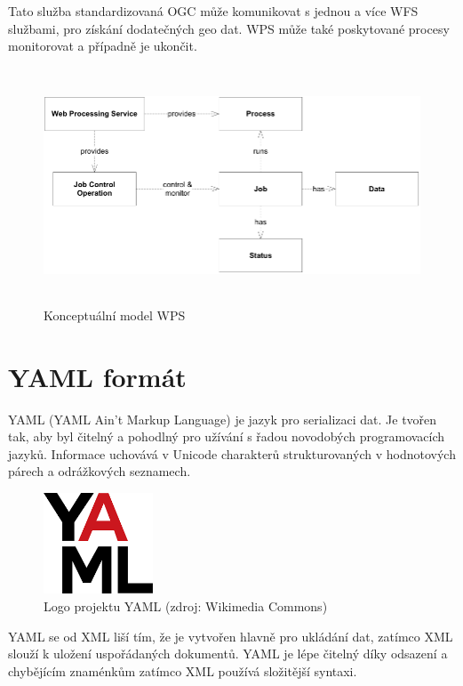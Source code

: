 \documentclass[a4paper,oneside,12pt]{book}
\begin{document}
\hspace{10mm}Tato služba standardizovaná OGC může komunikovat s jednou a více WFS službami, pro získání dodatečných geo dat. \cite{Stollberg2007} WPS může také poskytované procesy monitorovat a případně je ukončit. \cite{5Xjhvf3W3tsG6nhX} 

\begin{figure}[ht] \label{obr6}
\centering
\includegraphics[height=7cm]{pictures/WPS.png}
\caption{Konceptuální model WPS \cite{5Xjhvf3W3tsG6nhX}}
\label{fig:wps}
\end{figure}


\section{YAML formát} \label{yaml}



\hspace{10mm}YAML (YAML Ain’t Markup Language) je jazyk pro serializaci dat. Je tvořen tak, aby byl čitelný a pohodlný pro užívání s řadou novodobých programovacích jazyků. Informace uchovává v Unicode charakterů strukturovaných v hodnotových párech a  odrážkových seznamech.  \cite{hsOq0virmVAO85Ud}
\begin{figure}[ht] \label{obr7}
\centering
\includegraphics[height=3cm]{pictures/yaml.png}
\caption{Logo projektu YAML  (zdroj: Wikimedia Commons)}
\label{fig:yaml}
\end{figure}

\hspace{10mm}YAML se od XML liší tím, že je vytvořen hlavně pro ukládání dat, zatímco XML slouží k uložení uspořádaných dokumentů. YAML je lépe čitelný díky odsazení a chybějícím znaménkům zatímco XML používá složitější syntaxi. \cite{hsOq0virmVAO85Ud}
\end{document}
